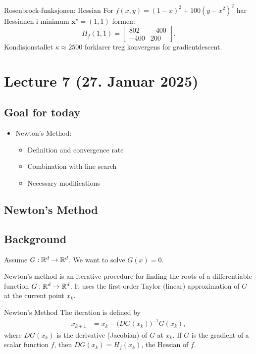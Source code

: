 \begin{example}{Rosenbrock-funksjonen: Hessian}{}
  For \( f(x,y) = (1 - x)^2 + 100(y - x^2)^2 \) har Hessianen i minimum \( \bm{x}^\star = (1,1) \) formen:
  \[
    H_f(1,1) = \begin{bmatrix} 802 & -400 \\ -400 & 200 \end{bmatrix}.
  \]
  Kondisjonstallet \( \kappa \approx 2500 \) forklarer treg konvergens for gradientdescent.
\end{example}

\section{Lecture 7 (27. Januar 2025)}

\subsection*{Goal for today}
\begin{itemize}
  \item Newton's Method:
        \begin{itemize}
          \item Definition and convergence rate
          \item Combination with line search
          \item Necessary modifications
        \end{itemize}
\end{itemize}

\subsection*{Newton's Method}

\subsection*{Background}
Assume \(G: \mathbb{R}^d \to \mathbb{R}^d\). We want to solve \(G(x) = 0\).

Newton's method is an iterative procedure for finding the roots of a differentiable function \(G: \mathbb{R}^d \to \mathbb{R}^d\).
It uses the first-order Taylor (linear) approximation of \(G\) at the current point \(x_k\).

\begin{definition}{Newton's Method}{}
  The iteration is defined by
  \begin{align*}
    x_{k+1} & = x_k - \bigl(D G(x_k)\bigr)^{-1} G(x_k),
  \end{align*}
  where \(D G(x_k)\) is the derivative (Jacobian) of \(G\) at \(x_k\). If \(G\) is the gradient of a scalar function \(f\), then \(DG(x_k) = H_f(x_k)\), the Hessian of \(f\).
\end{definition}

